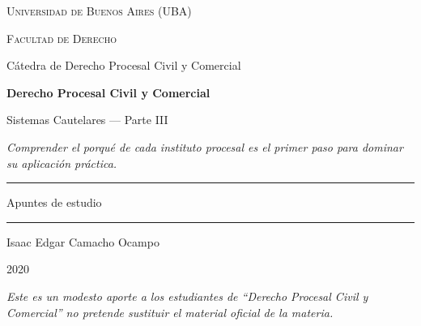 \documentclass[12pt,oneside]{book}
\newcommand{\universidad}{Universidad de Buenos Aires (UBA)}
\newcommand{\facultad}{Facultad de Derecho}
\newcommand{\catedra}{Cátedra de Derecho Procesal Civil y Comercial}
\newcommand{\materia}{Derecho Procesal Civil y Comercial}
\newcommand{\titulo}{Sistemas Cautelares --- Parte III}
\newcommand{\autor}{Isaac Edgar Camacho Ocampo}
\newcommand{\anio}{2020}
\begin{document}
\begin{titlepage}
\thispagestyle{empty}

\begin{center}

\vspace*{1cm}

{\large \textsc{\universidad}}

\vspace{0.2cm}

{\large \textsc{\facultad}}

\vspace{0.2cm}

{\large \catedra}

\vspace{3cm}

{\Huge \textbf{\materia}}

\vspace{1cm}

{\LARGE \titulo}

\vspace{0.8cm}

\textit{Comprender el porqué de cada instituto procesal es el primer paso para dominar su aplicación práctica.}

\vspace{1.2cm}

\rule{0.70\textwidth}{0.5pt}

\vspace{0.5cm}

{\large Apuntes de estudio}

\vspace{0.5cm}

\rule{0.70\textwidth}{0.5pt}

\vfill

{\large \autor}

\vspace{0.3cm}

{\large \anio}

\end{center}

\vfill

\begin{flushleft}
\textit{Este es un modesto aporte a los estudiantes de ``Derecho Procesal Civil y Comercial'' no pretende sustituir el material oficial de la materia.}
\end{flushleft}

\end{titlepage}
\end{document}
